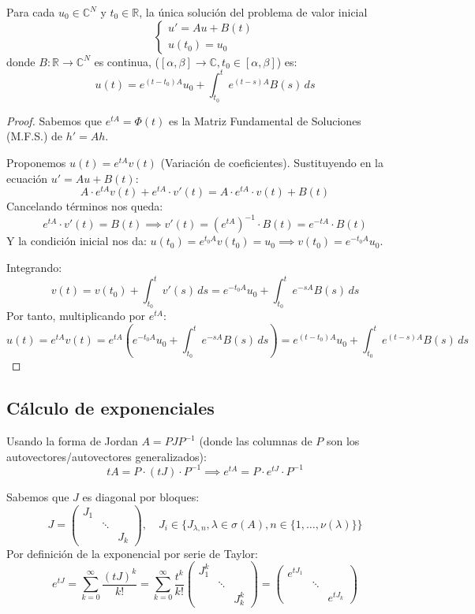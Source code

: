 \begin{teorema}
    Para cada $u_0 \in \mathbb{C}^N$ y $t_0 \in \mathbb{R}$, la única solución del problema de valor inicial
    \[
        \begin{cases}
            u' = Au + B(t) \\
            u(t_0) = u_0
        \end{cases}
    \]
    donde $B : \mathbb{R} \to \mathbb{C}^N$ es continua, ($[\alpha,\beta] \rightarrow \mathbb{C}, t_0 \in [\alpha,\beta]$) es:
    \[
        u(t) = e^{(t-t_0)A} u_0 + \int_{t_0}^t e^{(t-s)A} B(s) \, ds
    \]
\end{teorema}

\begin{proof}
    Sabemos que $e^{tA} = \Phi(t)$ es la Matriz Fundamental de Soluciones (M.F.S.) de $h' = Ah$.
    
    Proponemos $u(t) = e^{tA} v(t)$ (Variación de coeficientes).
    Sustituyendo en la ecuación $u' = Au + B(t)$:
    \[
        A \cdot e^{tA} v(t) + e^{tA} \cdot v'(t) = A \cdot e^{tA} \cdot v(t) + B(t)
    \]
    Cancelando términos nos queda:
    \[
        e^{tA} \cdot v'(t) = B(t) \implies v'(t) = (e^{tA})^{-1} \cdot B(t) = e^{-tA} \cdot B(t)
    \]
    Y la condición inicial nos da: $u(t_0) = e^{t_0 A} v(t_0) = u_0 \implies v(t_0) = e^{-t_0 A} u_0$.
    
    Integrando:
    \[
        v(t) = v(t_0) + \int_{t_0}^t v'(s) \, ds = e^{-t_0 A} u_0 + \int_{t_0}^t e^{-sA} B(s) \, ds
    \]
    Por tanto, multiplicando por $e^{tA}$:
    \[
        u(t) = e^{tA} v(t) = e^{tA} \left( e^{-t_0 A} u_0 + \int_{t_0}^t e^{-sA} B(s) \, ds \right) = e^{(t-t_0)A} u_0 + \int_{t_0}^t e^{(t-s)A} B(s) \, ds
    \]
\end{proof}

\subsection*{Cálculo de exponenciales}

Usando la forma de Jordan $A = P J P^{-1}$ (donde las columnas de $P$ son los autovectores/autovectores generalizados):
\[
    tA = P \cdot (tJ) \cdot P^{-1} \implies e^{tA} = P \cdot e^{tJ} \cdot P^{-1}
\]

Sabemos que $J$ es diagonal por bloques:
\[
    J = \begin{pmatrix} J_1 & & \\ & \ddots & \\ & & J_k \end{pmatrix}, \quad J_i \in \{J_{\lambda,n}, \lambda \in \sigma(A), n \in \{1, \dots, \nu(\lambda)\}\}
\]
Por definición de la exponencial por serie de Taylor:
\[
    e^{tJ} = \sum_{k=0}^{\infty} \frac{(tJ)^k}{k!} = \sum_{k=0}^{\infty} \frac{t^k}{k!} \begin{pmatrix} J_1^k & & \\ & \ddots & \\ & & J_k^k \end{pmatrix} = \begin{pmatrix} e^{tJ_1} & & \\ & \ddots & \\ & & e^{tJ_k} \end{pmatrix}
\]

